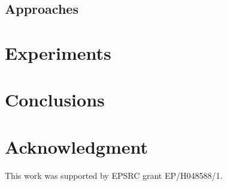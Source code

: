 \documentclass[conference]{IEEEtran}
\begin{document}


\subsection{Approaches} \label{sec:fastEvoMem}



\section{Experiments} \label{sec:exp}




\section{Conclusions} \label{sec:conc}


 
\section*{Acknowledgment}


\noindent This work was supported by EPSRC grant EP/H048588/1.

 



\end{document}
